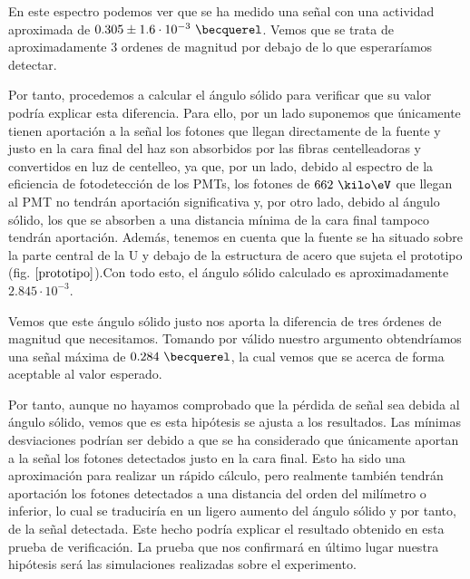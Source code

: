 En este espectro podemos ver que se ha medido una señal con una actividad aproximada de $0.305 \pm 1.6 \cdot 10^{-3}~\becquerel$. Vemos que se trata de aproximadamente 3 ordenes de magnitud por debajo de lo que esperaríamos detectar.

Por tanto, procedemos a calcular el ángulo sólido para verificar que su valor podría explicar esta diferencia. Para ello, por un lado suponemos que únicamente tienen aportación a la señal los fotones que llegan directamente de la fuente y justo en la cara final del haz son absorbidos por las fibras centelleadoras y convertidos en luz de centelleo,  ya que, por un lado, debido al espectro de la eficiencia de fotodetección de los PMTs, los fotones de $662~\kilo\eV$ que llegan al PMT no tendrán aportación significativa y, por otro lado, debido al ángulo sólido, los que se absorben a una distancia mínima de la cara final tampoco tendrán aportación. Además, tenemos en cuenta que la fuente se ha situado sobre la parte central de la U y debajo de la estructura de acero que sujeta el prototipo (fig. $\ref{prototipo}$).Con todo esto, el ángulo sólido calculado es aproximadamente $2.845 \cdotp 10^{-3}$. 

Vemos que este ángulo sólido justo nos aporta la diferencia de tres órdenes de magnitud que necesitamos. Tomando por válido nuestro argumento obtendríamos una señal máxima de $0.284~\becquerel$, la cual vemos que se acerca de forma aceptable al valor esperado.

Por tanto, aunque no hayamos comprobado que la pérdida de señal sea debida al ángulo sólido, vemos que es esta hipótesis se ajusta  a los resultados. Las mínimas desviaciones podrían ser debido a que se ha considerado que únicamente aportan a la señal los fotones detectados justo en la cara final. Esto ha sido una aproximación para realizar un rápido cálculo, pero realmente también tendrán aportación los fotones detectados a una distancia del orden del milímetro o inferior, lo cual se traduciría en un ligero aumento del ángulo sólido y por tanto, de la señal detectada. Este hecho podría explicar  el resultado obtenido en esta prueba de verificación. La prueba que nos confirmará en último lugar nuestra hipótesis será las simulaciones realizadas sobre el experimento.
